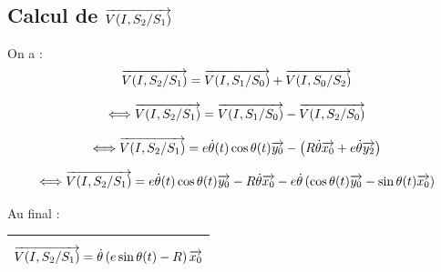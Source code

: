 \documentclass[10pt,oneside]{article}
\begin{document}
\subsection*{Calcul de $\overrightarrow{V(I,S_2/S_1)}$}
On a :
$$
\overrightarrow{V(I,S_2/S_1)} = \overrightarrow{V(I,S_1/S_0)} + \overrightarrow{V(I,S_0/S_2)}
$$

$$
\Longleftrightarrow \overrightarrow{V(I,S_2/S_1)} = \overrightarrow{V(I,S_1/S_0)} - \overrightarrow{V(I,S_2/S_0)}
$$

$$
\Longleftrightarrow \overrightarrow{V(I,S_2/S_1)} =  e \dot{\theta}(t) \cos \theta(t) \overrightarrow{y_0} - \left( R\dot{\theta}\overrightarrow{x_0} + e\dot{\theta}\overrightarrow{y_2} \right)
$$

$$
\Longleftrightarrow \overrightarrow{V(I,S_2/S_1)} = 
 e \dot{\theta}(t) \cos \theta(t) \overrightarrow{y_0} 
- R\dot{\theta}\overrightarrow{x_0} 
- e\dot{\theta}\left( \cos \theta(t) \overrightarrow{y_0}- \sin \theta(t) \overrightarrow{x_0} \right)
$$

Au final :
\begin{center}
\begin{tabular}{|p{8cm}|}
\hline
$$
\overrightarrow{V(I,S_2/S_1)} =  \dot{\theta}\left(e\sin \theta(t) - R\right)\overrightarrow{x_0} 
$$\\
\hline
\end{tabular}
\end{center}
\end{document}
